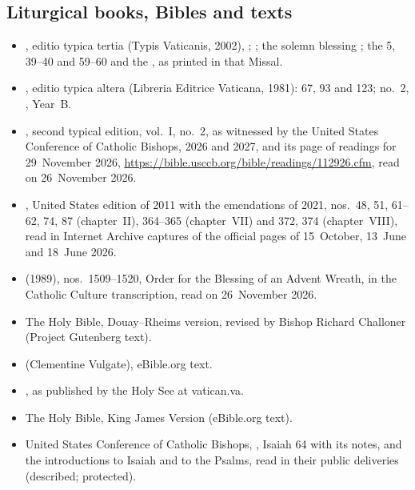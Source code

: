 {\small
\subsection*{Liturgical books, Bibles and texts}
\begin{itemize}[itemsep=0pt,topsep=.25em]
\item {}, editio typica tertia (Typis Vaticanis, 2002), ; ; the solemn blessing ; the  5, 39--40 and 59--60 and the , as printed in that Missal.
\item {}, editio typica altera (Libreria Editrice Vaticana, 1981):  67, 93 and 123; no.~2, , Year~B.
\item {}, second typical edition, vol.~I, no.~2, as witnessed by the United States Conference of Catholic Bishops,  2026 and 2027, and its page of readings for 29~November 2026, \url{https://bible.usccb.org/bible/readings/112926.cfm}, read on 26~November 2026.
\item {}, United States edition of 2011 with the emendations of 2021, nos.~48, 51, 61--62, 74, 87 (chapter~II), 364--365 (chapter~VII) and 372, 374 (chapter~VIII), read in Internet Archive captures of the official pages of 15~October, 13~June and 18~June 2026.
\item {} (1989), nos.~1509--1520, Order for the Blessing of an Advent Wreath, in the Catholic Culture transcription, read on 26~November 2026.
\item The Holy Bible, Douay--Rheims version, revised by Bishop Richard Challoner (Project Gutenberg text).
\item {} (Clementine Vulgate), eBible.org text.
\item {}, as published by the Holy See at vatican.va.
\item The Holy Bible, King James Version (eBible.org text).
\item United States Conference of Catholic Bishops, , Isaiah 64 with its notes, and the introductions to Isaiah and to the Psalms, read in their public deliveries (described; protected).
\end{itemize}

}
